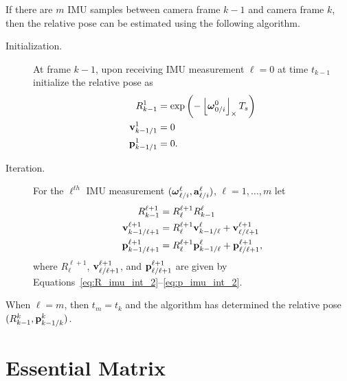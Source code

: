 If there are $m$ IMU samples between camera frame $k-1$ and camera frame $k$, then the relative pose can be estimated using the following algorithm.
\begin{description}
	\item[Initialization.] At frame $k-1$, upon receiving IMU measurement $\ell=0$ at time $t_{k-1}$ initialize the relative pose as
	\begin{align*}
	R_{k-1}^1 &= \exp\left(-\left\lfloor\boldsymbol{\omega}_{0/i}^0\right\rfloor_{\times}T_s\right) \\
	\mathbf{v}_{k-1/1}^1 &= 0 \\
	\mathbf{p}_{k-1/1}^1 &= 0.
	\end{align*}
	\item[Iteration.] For the $\ell^{th}$ IMU measurement $(\boldsymbol{\omega}_{\ell/i}^\ell, \mathbf{a}_{\ell/i}^\ell)$, $\ell=1,\dots,m$ let 
	\begin{align*}
	R_{k-1}^{\ell+1} &= R_\ell^{\ell+1} R_{k-1}^{\ell} \\
	\mathbf{v}_{k-1/\ell+1}^{\ell+1} &=  R_{\ell}^{\ell+1}\mathbf{v}_{k-1/\ell}^{\ell} + \mathbf{v}_{\ell/\ell+1}^{\ell+1} \\
	\mathbf{p}_{k-1/\ell+1}^{\ell+1} &= R_{\ell}^{\ell+1}\mathbf{p}_{k-1/\ell}^{\ell} + \mathbf{p}_{\ell/\ell+1}^{\ell+1},
	\end{align*} 
	where $R_{\ell}^{\ell+1}$, $\mathbf{v}_{\ell/\ell+1}^{\ell+1}$, and $\mathbf{p}_{\ell/\ell+1}^{\ell+1}$ are given by Equations~\eqref{eq:R_imu_int_2}--\eqref{eq:p_imu_int_2}.
\end{description}
When $\ell=m$, then $t_m=t_k$ and the algorithm has determined the relative pose $(R_{k-1}^k, \mathbf{p}_{k-1/k}^k)$.


\section{Essential Matrix}
\label{sec:essential_matrix}
%

